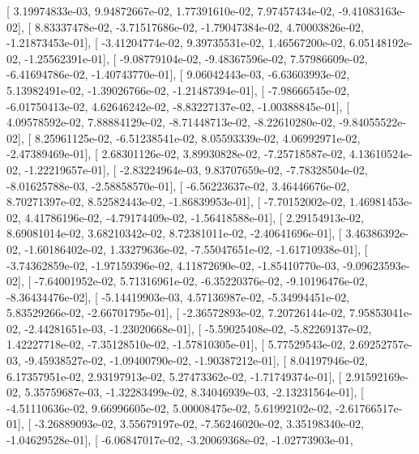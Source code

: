 \documentclass{article}
\begin{document}
       [  3.19974833e-03,   9.94872667e-02,   1.77391610e-02,
          7.97457434e-02,  -9.41083163e-02],
       [  8.83337478e-02,  -3.71517686e-02,  -1.79047384e-02,
          4.70003826e-02,  -1.21873453e-01],
       [ -3.41204774e-02,   9.39735531e-02,   1.46567200e-02,
          6.05148192e-02,  -1.25562391e-01],
       [ -9.08779104e-02,  -9.48367596e-02,   7.57986609e-02,
         -6.41694786e-02,  -1.40743770e-01],
       [  9.06042443e-03,  -6.63603993e-02,   5.13982491e-02,
         -1.39026766e-02,  -1.21487394e-01],
       [ -7.98666545e-02,  -6.01750413e-02,   4.62646242e-02,
         -8.83227137e-02,  -1.00388845e-01],
       [  4.09578592e-02,   7.88884129e-02,  -8.71448713e-02,
         -8.22610280e-02,  -9.84055522e-02],
       [  8.25961125e-02,  -6.51238541e-02,   8.05593339e-02,
          4.06992971e-02,  -2.47389469e-01],
       [  2.68301126e-02,   3.89930828e-02,  -7.25718587e-02,
          4.13610524e-02,  -1.22219657e-01],
       [ -2.83224964e-03,   9.83707659e-02,  -7.78328504e-02,
         -8.01625788e-03,  -2.58858570e-01],
       [ -6.56223637e-02,   3.46446676e-02,   8.70271397e-02,
          8.52582443e-02,  -1.86839953e-01],
       [ -7.70152002e-02,   1.46981453e-02,   4.41786196e-02,
         -4.79174409e-02,  -1.56418588e-01],
       [  2.29154913e-02,   8.69081014e-02,   3.68210342e-02,
          8.72381011e-02,  -2.40641696e-01],
       [  3.46386392e-02,  -1.60186402e-02,   1.33279636e-02,
         -7.55047651e-02,  -1.61710938e-01],
       [ -3.74362859e-02,  -1.97159396e-02,   4.11872690e-02,
         -1.85410770e-03,  -9.09623593e-02],
       [ -7.64001952e-02,   5.71316961e-02,  -6.35220376e-02,
         -9.10196476e-02,  -8.36434476e-02],
       [ -5.14419903e-03,   4.57136987e-02,  -5.34994451e-02,
          5.83529266e-02,  -2.66701795e-01],
       [ -2.36572893e-02,   7.20726144e-02,   7.95853041e-02,
         -2.44281651e-03,  -1.23020668e-01],
       [ -5.59025408e-02,  -5.82269137e-02,   1.42227718e-02,
         -7.35128510e-02,  -1.57810305e-01],
       [  5.77529543e-02,   2.69252757e-03,  -9.45938527e-02,
         -1.09400790e-02,  -1.90387212e-01],
       [  8.04197946e-02,   6.17357951e-02,   2.93197913e-02,
          5.27473362e-02,  -1.71749374e-01],
       [  2.91592169e-02,   5.35759687e-03,  -1.32283499e-02,
          8.34046939e-03,  -2.13231564e-01],
       [ -4.51110636e-02,   9.66996605e-02,   5.00008475e-02,
          5.61992102e-02,  -2.61766517e-01],
       [ -3.26889093e-02,   3.55679197e-02,  -7.56246020e-02,
          3.35198340e-02,  -1.04629528e-01],
       [ -6.06847017e-02,  -3.20069368e-02,  -1.02773903e-01,
\end{document}
